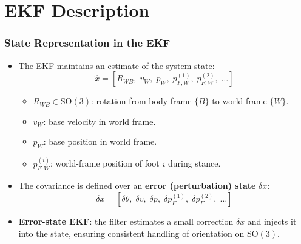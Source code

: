 \documentclass[aspectratio=169]{beamer}
\begin{document}
\section{EKF Description}
\begin{frame}
	\frametitle{State Representation in the EKF}
	
	\begin{itemize}
		\item The EKF maintains an estimate of the system state:
		\[
		\hat{x} =
		\left[
		R_{WB},\;
		v_W,\;
		p_W,\;
		p^{(1)}_{F,W},\;
		p^{(2)}_{F,W},\;
		\ldots
		\right]
		\]
		\vspace{-0.2cm}
		\begin{itemize}
			\item $R_{WB} \in \mathrm{SO}(3)$: rotation from body frame $\{B\}$ to world frame $\{W\}$.
			\item $v_W$: base velocity in world frame.
			\item $p_W$: base position in world frame.
			\item $p^{(i)}_{F,W}$: world-frame position of foot $i$ during stance.
		\end{itemize}
		\vspace{0.2cm}
		\item The covariance is defined over an \textbf{error (perturbation) state} $\delta x$:
		\[
		\delta x =
		\left[
		\delta\theta,\;
		\delta v,\;
		\delta p,\;
		\delta p^{(1)}_F,\;
		\delta p^{(2)}_F,\;
		\ldots
		\right]
		\]
		
		\item \textbf{Error-state EKF}: the filter estimates a small correction $\delta x$ and injects it into the state, ensuring consistent handling of orientation on $\mathrm{SO}(3)$.
		
	\end{itemize}
	
\end{frame}
\end{document}
